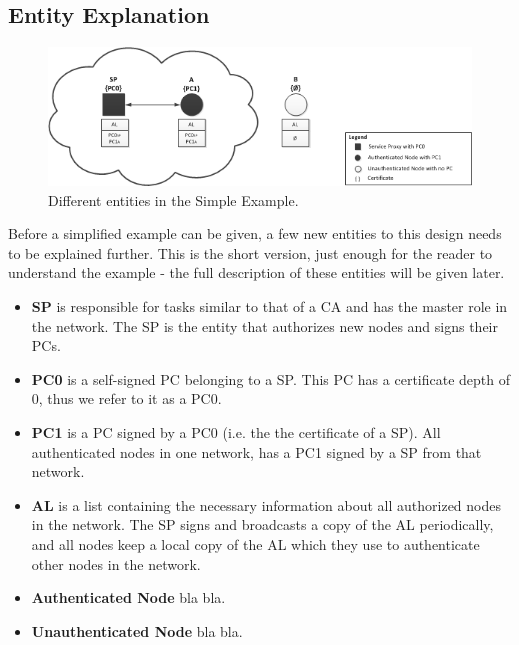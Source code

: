 \subsection{Entity Explanation}

\begin{figure}[ht!]
	\centering
  	\includegraphics{images/simple_example_entities.png}
  	\caption{Different entities in the Simple Example.}
	\label{fig:simple_example_entities}
\end{figure}

Before a simplified example can be given, a few new entities to this design
needs to be explained further. This is the short version, just enough for the
reader to understand the example - the full description of these entities will
be given later.

\begin{itemize}
  \item \textbf{\acf{SP}} is responsible for tasks similar to that of a \ac{CA}
  	and has the master role in the network. The \ac{SP} is the entity that
 	 authorizes new nodes and signs their \acp{PC}.
  \item \textbf{\acf{PC0}} is a self-signed \ac{PC} belonging to a
  	\ac{SP}. This \ac{PC} has a certificate depth of 0, thus we refer to it as a
  	\ac{PC0}.
  \item \textbf{\acf{PC1}} is a \ac{PC} signed by a \ac{PC0} (i.e. the the
	 certificate of a \ac{SP}). All authenticated nodes in one network, has a
 	 \ac{PC1} signed by a \ac{SP} from that network.
  \item \textbf{\acf{AL}} is a list containing the necessary information about
 	all authorized nodes in the network. The \ac{SP} signs and broadcasts a copy
 	of the \ac{AL} periodically, and all nodes keep a local copy of the \ac{AL}
  	which they use to authenticate other nodes in the network.
  \item \textbf{Authenticated Node} bla bla.
  \item \textbf{Unauthenticated Node} bla bla.
\end{itemize}

